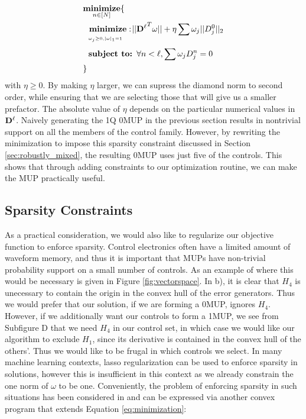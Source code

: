 \documentclass[aps,nofootinbib,pra,notitlepage,twocolumn]{revtex4-1}
\begin{document}
\newcommand{\bunderbrace}[2]{%
  \begin{array}[t]{@{}c@{}}
  #1\\
  \parbox{\widthof{#1}}{$\scriptscriptstyle#2$}
  \end{array}
}

\begin{equation}\label{eq:minimization_l2}
\begin{split}
&\underset{n\in[N]}{\textbf{minimize}}\{\\
&\ \ \bunderbrace{\textbf{minimize}: }{\omega_j\geq0, |\omega|_1=1} ||{\bold{D}^{\ell}}^T\omega||+ \eta\sum\omega_j||D^0_j||_2\\
&\ \ \textbf{subject to: } \forall n<\ell, \sum \omega_jD_j^n=0\\
&\}
\end{split}
\end{equation}
with $\eta \geq 0$. By making $\eta$ larger, we can supress the diamond norm to second order, while ensuring that we are selecting those that will give us a smaller prefactor. The absolute value of $\eta$ depends on the particular numerical values in $\bold{D}^\ell$. Naively generating the 1Q 0MUP in the previous section results in nontrivial support on all the members of the control family. However, by rewriting the minimization to impose this sparsity constraint discussed in Section \ref{sec:robustly_mixed}, the resulting 0MUP uses just five of the controls. This shows that through adding constraints to our optimization routine, we can make the MUP practically useful. 

\subsection{Sparsity Constraints}
As a practical consideration, we would also like to regularize our objective function to enforce sparsity. Control electronics often have a limited amount of waveform memory, and thus it is important that MUPs have non-trivial probability support on a small number of controls. As an example of where this would be necessary is given in Figure \ref{fig:vectorspace}. In b), it is clear that $H_4$ is unecessary to contain the origin in the convex hull of the error generators. Thus we would prefer that our solution, if we are forming a $0$MUP, ignores $H_4$. However, if we additionally want our controls to form a 1MUP, we see from Subfigure D that we need $H_4$ in our control set, in which case we would like our algorithm to exclude $H_1$, since its derivative is contained in the convex hull of the others'. Thus we would like to be frugal in which controls we select. In many machine learning contexts, lasso regularization \cite{tibshirani1996regression} can be used to enforce sparsity in solutions, however this is insufficient in this context as we already constrain the one norm of $\omega$ to be one. Conveniently, the problem of enforcing sparsity in such situations has been considered in \cite{NIPS2012_4504} and can be expressed via another convex program that extends Equation \ref{eq:minimization}:
\end{document}
